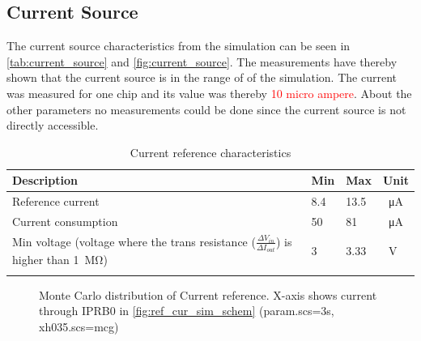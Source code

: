 \subsection{Current Source}
The current source characteristics from the simulation can be seen in \autoref{tab:current_source} and \autoref{fig:current_source}. The measurements have thereby shown that the current source is in the range of of the simulation. The current was measured for one chip and its value was thereby \textcolor{red}{10 micro ampere}. About the other parameters no measurements could be done since the current source is not directly accessible.
\begin{longtable}{|p{3.5cm}|p{3.5cm}|p{3.5cm}|p{3.5cm}|}
	\hline
	\rowcolor{lightgray}
	\textbf{Description} &\textbf{Min} &\textbf{Max} & \textbf{Unit} \\ \hline
	
	Reference current & 8.4 & 13.5 &\qty{}{\micro\ampere} \\ \hline
	Current consumption & 50 & 81 & \qty{}{\micro\ampere} \\ \hline
	Min voltage (voltage where the trans resistance ($\frac{\Delta V_{in}}{\Delta I_{out}}$) is higher than \qty{1}{\mega\ohm}) & 3& 3.33 & \qty{}{\volt} \\ \hline
	\caption{Current reference characteristics} %
	\label{tab:bootstrap}
\end{longtable}
\begin{figure}[ht]
	\centering
	
	\caption{Monte Carlo distribution of Current reference. X-axis shows current through \glqq IPRB0\grqq{} in \autoref{fig:ref_cur_sim_schem} (param.scs=3s, xh035.scs=mcg)}
	\label{fig:ref_cur_mont}
\end{figure}
\clearpage
